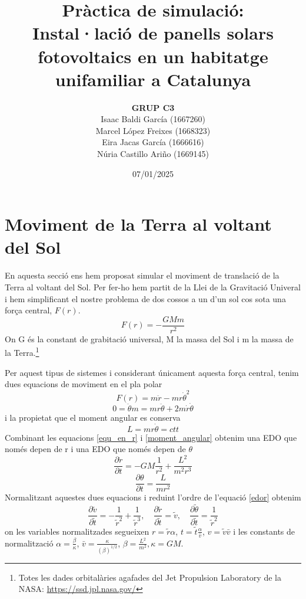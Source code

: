 \documentclass[11pt]{article}
\title{\Huge\bfseries Pràctica de simulació: \\ Instal·lació de panells solars fotovoltaics en un habitatge unifamiliar a Catalunya \\ [2ex] \Large}
\author{\begin{tabular}{c}
\textbf{GRUP C3} \\
Isaac Baldi García (1667260)\\
Marcel López Freixes (1668323) \\
Eira Jacas García (1666616) \\
Núria Castillo Ariño (1669145)
\end{tabular}}
\date{07/01/2025}
\begin{document}
\maketitle
\newpage

\tableofcontents
\newpage

\section{Moviment de la Terra al voltant del Sol} \label{sec: seccio_1}
En aquesta secció ens hem proposat simular el moviment de translació de la Terra al voltant del Sol. Per fer-ho hem partit de la Llei de la Gravitació Univeral i hem simplificant el nostre problema de dos cossos a un d'un sol cos sota una força central, $F(r)$.
\begin{equation}
    F(r)=-\frac{GMm}{r^2}
\end{equation}
On G és la constant de grabitació universal, M la massa del Sol i m la massa de la Terra.\footnote{Totes les dades orbitalàries agafades del Jet Propulsion Laboratory de la NASA: \url{https://ssd.jpl.nasa.gov/}}

Per aquest tipus de sistemes i considerant únicament aquesta força central, tenim dues equacions de moviment en el pla polar 
\begin{equation}
    F(r)=m\ddot{r}-mr{\dot{\theta}}^2
    \label{equ_en_r}
\end{equation}
\begin{equation}
    0=\ddot{\theta}m=mr\ddot{\theta}+2m\dot{r}\dot{\theta}
    \label{equ_en_theta}
\end{equation}
i la propietat que el moment angular es conserva
\begin{equation}
    L=mr\dot{\theta}=ctt
    \label{moment_angular}
\end{equation}
Combinant les equacions \eqref{equ_en_r} i \eqref{moment_angular} obtenim una EDO que només depen de r i una EDO que només depen de $\theta$
\begin{equation}
    \frac{\partial\dot{r}}{\partial t}=-GM\frac{1}{r^2}+\frac{L^2}{m^2r^3}
    \label{edor}
\end{equation}
\begin{equation}
    \frac{\partial\theta}{\partial t}=\frac{L}{mr^2}
    \label{edot}
\end{equation}
Normalitzant aquestes dues equacions i reduint l'ordre de l'equació \eqref{edor} obtenim
\begin{equation}
    \frac{\partial\tilde{v}}{\partial\tilde{t}}=-\frac{1}{\tilde{r}^2}+\frac{1}{\tilde{r}^3}, \quad
    \frac{\partial\tilde{r}}{\partial\tilde{t}}=\tilde{v}, \quad
    \frac{\partial\tilde{\theta}}{\partial\tilde{t}}=\frac{1}{\tilde{r}^2}
    \label{eq:all}
\end{equation}
on les variables normalitzades segueixen $r=\tilde{r}\alpha$, $t=\tilde{t}\frac{\alpha}{\bar{v}}$, $v=\tilde{v}\bar{v}$ i les constants de normalització $\alpha = \frac{\beta}{\kappa}$, $\bar{v}=\frac{\kappa}{(\beta)^{1/2}}$, $\beta=\frac{L^2}{m^2}, \kappa=GM$.
\end{document}
